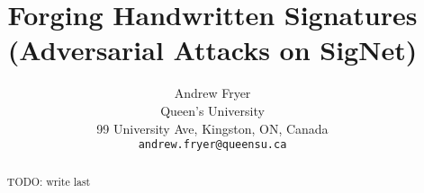 \documentclass[final]{cvpr}
\begin{document}
\title{Forging Handwritten Signatures (Adversarial Attacks on SigNet)}

\author{Andrew Fryer\\
Queen's University\\
99 University Ave, Kingston, ON, Canada\\
{\tt\small andrew.fryer@queensu.ca}
}

\maketitle


\begin{abstract}
   TODO: write last
\end{abstract}













{\small


}
\end{document}
